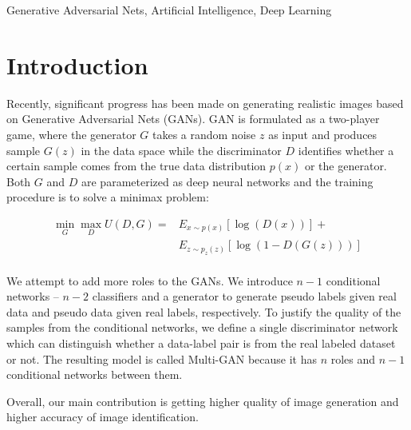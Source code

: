 \documentclass[conference]{IEEEtran}
\begin{document}
\begin{IEEEkeywords}
Generative Adversarial Nets, Artificial Intelligence, Deep Learning
\end{IEEEkeywords}

\section{Introduction}
Recently, significant progress has been made on generating realistic images based on Generative Adversarial Nets (GANs). GAN is formulated as a two-player game, where the generator $G$ takes a random noise $z$ as input and produces sample $G(z)$ in the data space while the discriminator $D$ identifies whether a certain sample comes from the true data distribution $p(x)$ or the generator. Both $G$ and $D$ are parameterized as deep neural networks and the training procedure is to solve a minimax problem:

$$
\begin{aligned}
\min_G\max_DU(D, G) = & E_{x \sim p(x)}[\log(D(x))] + \\
& E_{z \sim p_z(z)} [ \log(1 - D(G(z)))] \\
\end{aligned}
$$

We attempt to add more roles to the GANs. We introduce $n - 1$ conditional networks -- $n - 2$ classifiers and a generator to generate pseudo labels given real data and pseudo data given real labels, respectively. To justify the quality of the samples from the conditional networks, we define a single discriminator network which can distinguish whether a data-label pair is from the real labeled dataset or not. The resulting model is called Multi-GAN because it has $n$ roles and $n - 1$ conditional networks between them. 

Overall, our main contribution is getting higher quality of image generation and higher accuracy of image identification. 

\end{document}
